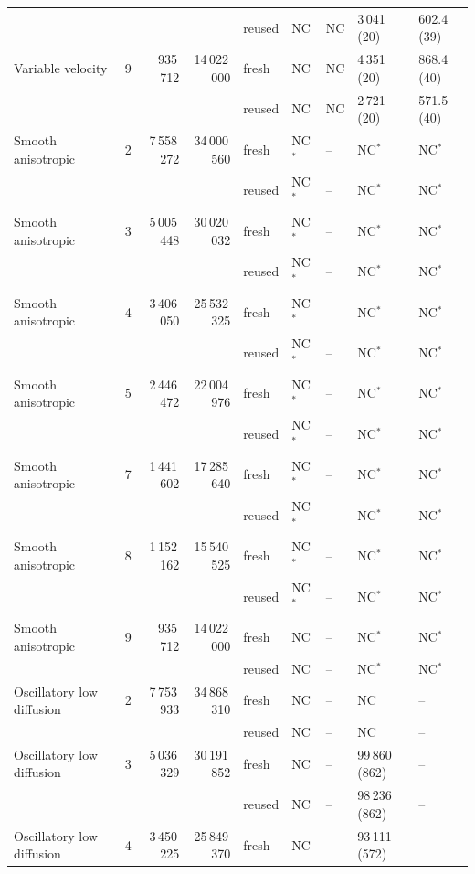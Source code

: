 \begin{tabular}{lrrrlllll}
 & & &  & reused & NC & NC & 3\,041 (20) & 602.4 (39)\\
\addlinespace[2pt]
Variable velocity & 9 & 935\,712 & 14\,022\,000 & fresh & NC & NC & 4\,351 (20) & 868.4 (40)\\
 & & &  & reused & NC & NC & 2\,721 (20) & 571.5 (40)\\
\addlinespace[2pt]
Smooth anisotropic & 2 & 7\,558\,272 & 34\,000\,560 & fresh & NC$^*$ & -- & NC$^*$ & NC$^*$\\
 & & &  & reused & NC$^*$ & -- & NC$^*$ & NC$^*$\\
\addlinespace[2pt]
Smooth anisotropic & 3 & 5\,005\,448 & 30\,020\,032 & fresh & NC$^*$ & -- & NC$^*$ & NC$^*$\\
 & & &  & reused & NC$^*$ & -- & NC$^*$ & NC$^*$\\
\addlinespace[2pt]
Smooth anisotropic & 4 & 3\,406\,050 & 25\,532\,325 & fresh & NC$^*$ & -- & NC$^*$ & NC$^*$\\
 & & &  & reused & NC$^*$ & -- & NC$^*$ & NC$^*$\\
\addlinespace[2pt]
Smooth anisotropic & 5 & 2\,446\,472 & 22\,004\,976 & fresh & NC$^*$ & -- & NC$^*$ & NC$^*$\\
 & & &  & reused & NC$^*$ & -- & NC$^*$ & NC$^*$\\
\addlinespace[2pt]
Smooth anisotropic & 7 & 1\,441\,602 & 17\,285\,640 & fresh & NC$^*$ & -- & NC$^*$ & NC$^*$\\
 & & &  & reused & NC$^*$ & -- & NC$^*$ & NC$^*$\\
\addlinespace[2pt]
Smooth anisotropic & 8 & 1\,152\,162 & 15\,540\,525 & fresh & NC$^*$ & -- & NC$^*$ & NC$^*$\\
 & & &  & reused & NC$^*$ & -- & NC$^*$ & NC$^*$\\
\addlinespace[2pt]
Smooth anisotropic & 9 & 935\,712 & 14\,022\,000 & fresh & NC & -- & NC$^*$ & NC$^*$\\
 & & &  & reused & NC & -- & NC$^*$ & NC$^*$\\
\addlinespace[2pt]
Oscillatory low diffusion & 2 & 7\,753\,933 & 34\,868\,310 & fresh & NC & -- & NC & --\\
 & & &  & reused & NC & -- & NC & --\\
\addlinespace[2pt]
Oscillatory low diffusion & 3 & 5\,036\,329 & 30\,191\,852 & fresh & NC & -- & 99\,860 (862) & --\\
 & & &  & reused & NC & -- & 98\,236 (862) & --\\
\addlinespace[2pt]
Oscillatory low diffusion & 4 & 3\,450\,225 & 25\,849\,370 & fresh & NC & -- & 93\,111 (572) & --\\

\end{tabular}

